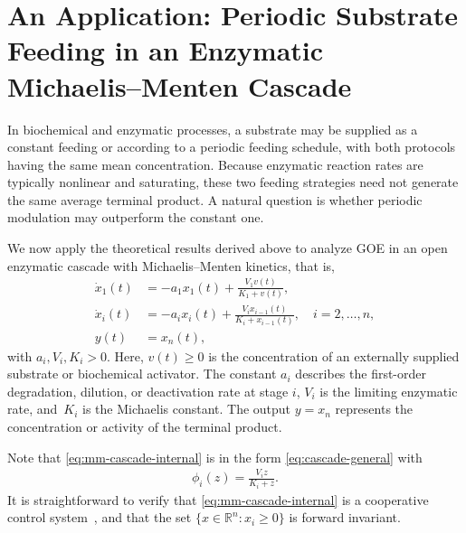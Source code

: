 \documentclass[onecolumn]{IEEEtran}
\newcommand{\R}{\mathbb{R}}
\begin{document}
\section{An Application: Periodic Substrate Feeding in an Enzymatic
Michaelis--Menten Cascade}
\label{sec:enzymatic-cascade}
% 
In biochemical and enzymatic processes,   a substrate may be supplied as a constant feeding
or according to a periodic
feeding schedule, with both protocols having the same mean concentration.
Because enzymatic reaction rates are typically nonlinear and saturating,
these two feeding strategies need not generate the same average terminal
product. 
A natural question is whether periodic modulation may outperform  the constant one. 

We now apply the theoretical results derived above to analyze GOE in an open enzymatic cascade with
Michaelis--Menten kinetics, that is, 
\begin{align}
    \dot x_1(t)
    &=
    -a_1x_1(t)
    +
    \frac{V_1v(t)}{K_1+v(t)},
    \nonumber\\
    \dot x_i(t)
    &=
    -a_ix_i(t)
    +
    \frac{V_ix_{i-1}(t)}
    {K_i+x_{i-1}(t)},
    \quad i=2,\ldots,n,
    \label{eq:mm-cascade-internal}\\
    y(t)&=x_n(t),
    \nonumber 
\end{align}
with $
    a_i,    V_i,
    K_i>0$.
Here,     $v(t)\geq0$ is  the concentration of an externally supplied
substrate or biochemical activator.
The constant
 $a_i$ describes  the first-order degradation, dilution, or deactivation rate
at stage $i$, $V_i$ is the limiting enzymatic rate, and~$K_i$ is the
Michaelis constant. The output $y=x_n$ represents the concentration or
activity of the terminal product.

   Note that \eqref{eq:mm-cascade-internal} 
   is in the form \eqref{eq:cascade-general} with
 \begin{align}\label{eq:enzi+phis} 
 \phi_i(z)
    =
    \frac{V_iz}{K_i+z}.
\end{align} 
 It is straightforward to verify that \eqref{eq:mm-cascade-internal} is a cooperative control system~\cite{monocontsystems}, and that the set $\{x\in\R^ n : x_i \geq 0\} $ is  forward invariant. 
 
\end{document}
